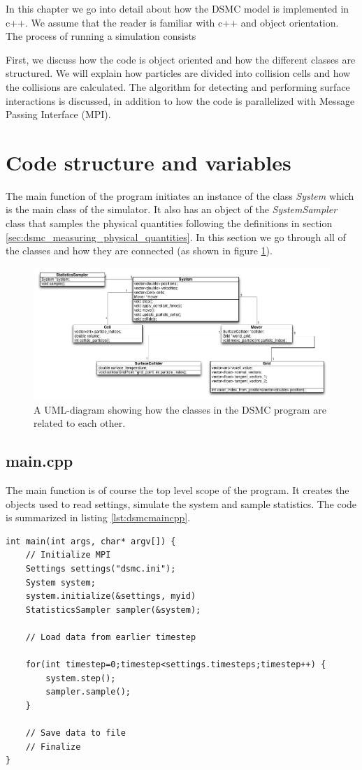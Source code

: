 In this chapter we go into detail about how the DSMC model is implemented in c++. We assume that the reader is familiar with c++ and object orientation. The process of running a simulation consists 


First, we discuss how the code is object oriented and how the different classes are structured. We will explain how particles are divided into collision cells and how the collisions are calculated. The algorithm for detecting and performing surface interactions is discussed, in addition to how the code is parallelized with Message Passing Interface (MPI).


\section{Code structure and variables}
The main function of the program initiates an instance of the class \textit{System} which is the main class of the simulator. It also has an object of the \textit{SystemSampler} class that samples the physical quantities following the definitions in section \ref{sec:dsmc_measuring_physical_quantities}. In this section we go through all of the classes and how they are connected (as shown in figure \ref{fig:dsmc_uml_diagram}). 
\begin{figure}[h]
\begin{center}
\includegraphics[width=\textwidth, trim=0cm 0cm 0cm 0cm, clip]{DSMC/figures/dsmcuml.png}
\end{center}
\caption{A UML-diagram showing how the classes in the DSMC program are related to each other.}
\label{fig:dsmc_uml_diagram}
\end{figure}
\subsection{main.cpp}
The main function is of course the top level scope of the program. It creates the objects used to read settings, simulate the system and sample statistics. The code is summarized in listing \ref{lst:dsmcmaincpp}.
\begin{lstlisting}[caption=main.cpp, label=lst:dsmcmaincpp]
int main(int args, char* argv[]) {
    // Initialize MPI
    Settings settings("dsmc.ini");
    System system;
    system.initialize(&settings, myid)
    StatisticsSampler sampler(&system);
    
    // Load data from earlier timestep

    for(int timestep=0;timestep<settings.timesteps;timestep++) {
    	system.step();
    	sampler.sample();
    }

    // Save data to file
    // Finalize
}
\end{lstlisting}
